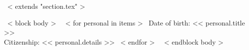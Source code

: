 ~< extends "section.tex" >~

~< block body >~
~< for personal in items >~
    Date of birth: << personal.title >> \\
    Citizenship: << personal.details >>
~< endfor >~
~< endblock body >~

